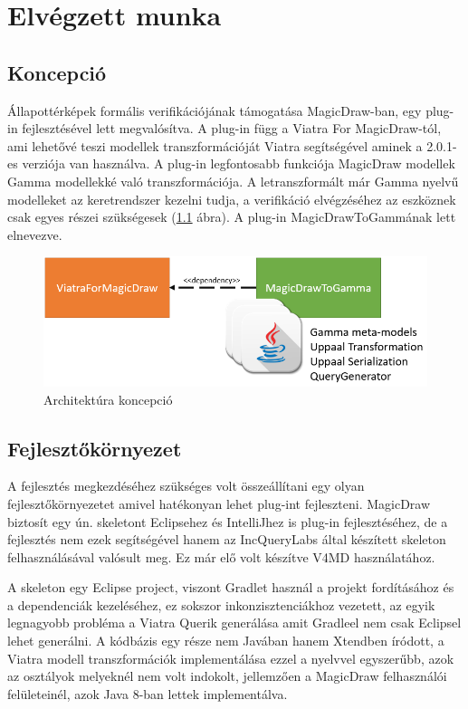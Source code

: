 \chapter{Elvégzett munka}


\section{Koncepció}
Állapottérképek formális verifikációjának támogatása MagicDraw-ban, egy plug-in fejlesztésével lett megvalósítva. A plug-in függ a Viatra For MagicDraw-tól, ami lehetővé teszi modellek transzformációját Viatra segítségével aminek a 2.0.1-es verziója van használva. A plug-in legfontosabb funkciója MagicDraw modellek Gamma modellekké való transzformációja. A letranszformált már Gamma nyelvű modelleket az keretrendszer kezelni tudja, a verifikáció elvégzéséhez az eszköznek csak egyes részei szükségesek (\ref{fig:used-gamma} ábra). A plug-in MagicDrawToGammának lett elnevezve.

\begin{figure}[!ht]
	\centering
	\includegraphics[keepaspectratio, width=120mm]{figures/plan.png}
	\caption{Architektúra koncepció}
	\label{fig:used-gamma}
\end{figure}

\section{Fejlesztőkörnyezet}
 A fejlesztés megkezdéséhez szükséges volt összeállítani egy olyan fejlesztőkörnyezetet amivel hatékonyan lehet plug-int fejleszteni. MagicDraw biztosít egy ún. skeletont Eclipsehez és IntelliJhez is plug-in fejlesztéséhez, de a fejlesztés nem ezek segítségével hanem az IncQueryLabs által készített skeleton felhasználásával valósult meg. Ez már elő volt készítve V4MD használatához.
 
A skeleton egy Eclipse project, viszont Gradlet használ a projekt fordításához és a dependenciák kezeléséhez, ez sokszor inkonzisztenciákhoz vezetett, az egyik legnagyobb probléma a Viatra Querik generálása amit Gradleel nem csak Eclipsel lehet generálni. A kódbázis egy része nem Javában hanem Xtendben íródott, a Viatra modell transzformációk implementálása ezzel a nyelvvel egyszerűbb, azok az osztályok melyeknél nem volt indokolt, jellemzően a MagicDraw felhasználói felületeinél, azok Java 8-ban lettek implementálva.

